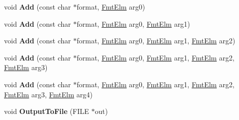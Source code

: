\begin{DoxyCompactItemize}
\item 
void {\bfseries Add} (const char $\ast$format, \hyperlink{classv8_1_1internal_1_1_fmt_elm}{Fmt\+Elm} arg0)\hypertarget{classv8_1_1internal_1_1_string_stream_a1d1b3fc5a877605c0779f53682724dd7}{}\label{classv8_1_1internal_1_1_string_stream_a1d1b3fc5a877605c0779f53682724dd7}

\item 
void {\bfseries Add} (const char $\ast$format, \hyperlink{classv8_1_1internal_1_1_fmt_elm}{Fmt\+Elm} arg0, \hyperlink{classv8_1_1internal_1_1_fmt_elm}{Fmt\+Elm} arg1)\hypertarget{classv8_1_1internal_1_1_string_stream_a05331177bf606d9c51f8327d0e558b48}{}\label{classv8_1_1internal_1_1_string_stream_a05331177bf606d9c51f8327d0e558b48}

\item 
void {\bfseries Add} (const char $\ast$format, \hyperlink{classv8_1_1internal_1_1_fmt_elm}{Fmt\+Elm} arg0, \hyperlink{classv8_1_1internal_1_1_fmt_elm}{Fmt\+Elm} arg1, \hyperlink{classv8_1_1internal_1_1_fmt_elm}{Fmt\+Elm} arg2)\hypertarget{classv8_1_1internal_1_1_string_stream_ae03a245fc782be3f1905de1d6ffcb22d}{}\label{classv8_1_1internal_1_1_string_stream_ae03a245fc782be3f1905de1d6ffcb22d}

\item 
void {\bfseries Add} (const char $\ast$format, \hyperlink{classv8_1_1internal_1_1_fmt_elm}{Fmt\+Elm} arg0, \hyperlink{classv8_1_1internal_1_1_fmt_elm}{Fmt\+Elm} arg1, \hyperlink{classv8_1_1internal_1_1_fmt_elm}{Fmt\+Elm} arg2, \hyperlink{classv8_1_1internal_1_1_fmt_elm}{Fmt\+Elm} arg3)\hypertarget{classv8_1_1internal_1_1_string_stream_ad2f0b88b6ed4b27bf04a39653a99143a}{}\label{classv8_1_1internal_1_1_string_stream_ad2f0b88b6ed4b27bf04a39653a99143a}

\item 
void {\bfseries Add} (const char $\ast$format, \hyperlink{classv8_1_1internal_1_1_fmt_elm}{Fmt\+Elm} arg0, \hyperlink{classv8_1_1internal_1_1_fmt_elm}{Fmt\+Elm} arg1, \hyperlink{classv8_1_1internal_1_1_fmt_elm}{Fmt\+Elm} arg2, \hyperlink{classv8_1_1internal_1_1_fmt_elm}{Fmt\+Elm} arg3, \hyperlink{classv8_1_1internal_1_1_fmt_elm}{Fmt\+Elm} arg4)\hypertarget{classv8_1_1internal_1_1_string_stream_a4e06fea1da10f2bc53f7e5f94e7e156c}{}\label{classv8_1_1internal_1_1_string_stream_a4e06fea1da10f2bc53f7e5f94e7e156c}

\item 
void {\bfseries Output\+To\+File} (F\+I\+LE $\ast$out)\hypertarget{classv8_1_1internal_1_1_string_stream_a8b576f5204b520bb54eb6d52506c275d}{}\label{classv8_1_1internal_1_1_string_stream_a8b576f5204b520bb54eb6d52506c275d}


\end{DoxyCompactItemize}
